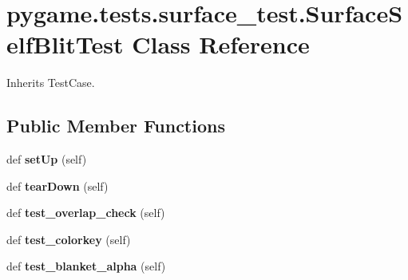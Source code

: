 \hypertarget{classpygame_1_1tests_1_1surface__test_1_1_surface_self_blit_test}{}\section{pygame.\+tests.\+surface\+\_\+test.\+Surface\+Self\+Blit\+Test Class Reference}
\label{classpygame_1_1tests_1_1surface__test_1_1_surface_self_blit_test}


Inherits Test\+Case.

\subsection*{Public Member Functions}
\begin{DoxyCompactItemize}
\item 
\mbox{\label{classpygame_1_1tests_1_1surface__test_1_1_surface_self_blit_test_ad9f56e519328e6a90797c3b112af6751}} 
def {\bfseries set\+Up} (self)
\item 
\mbox{\label{classpygame_1_1tests_1_1surface__test_1_1_surface_self_blit_test_aee3bb4988d85e6d684e99092711dd13d}} 
def {\bfseries tear\+Down} (self)
\item 
\mbox{\label{classpygame_1_1tests_1_1surface__test_1_1_surface_self_blit_test_aac780cc3142711334646437c145a6972}} 
def {\bfseries test\+\_\+overlap\+\_\+check} (self)
\item 
\mbox{\label{classpygame_1_1tests_1_1surface__test_1_1_surface_self_blit_test_a1155c9d7780ff2c30ffdafbb10e31b8f}} 
def {\bfseries test\+\_\+colorkey} (self)
\item 
\mbox{\label{classpygame_1_1tests_1_1surface__test_1_1_surface_self_blit_test_abecce47439d68075dc9864929c907e5d}} 
def {\bfseries test\+\_\+blanket\+\_\+alpha} (self)
\item 
\mbox{\label{classpygame_1_1tests_1_1surface__test_1_1_surface_self_blit_test_a89bc4c817af3dc4b18b16757ca02b2f0}} 

\end{DoxyCompactItemize}
